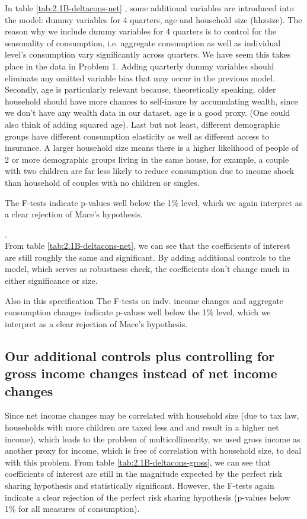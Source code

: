 \documentclass[12pt,a4paper]{article}
\begin{document}
In table \ref{tab:2.1B-deltacons-net} , some additional variables are introduced into the model: dummy variables for 4 quarters, age and household size (hhzsize). The reason why we include dummy variables for 4 quarters is to control for the seasonality of consumption, i.e. aggregate consumption as well as individual level's consumption vary significantly across quarters. We have seem this takes place in the data in Problem 1. Adding quarterly dummy variables should eliminate any omitted variable bias that may occur in the previous model. Secondly, age is particularly relevant because, theoretically speaking, older household should have more chances to self-insure by accumulating wealth, since we don't have any wealth data in our dataset, age is a good proxy. (One could also think of adding squared age). Last but not least, different demographic groups have different consumption elasticity as well as different access to insurance. A larger household size means there is a higher likelihood of people of 2 or more demographic groups living in the same house, for example, a couple with two children are far less likely to reduce consumption due to income shock than household of couples with no children or singles.

The F-tests indicate p-values well below the 1\% level, which we again interpret as a clear rejection of Mace's hypothesis. 

. \\

From table \ref{tab:2.1B-deltacons-net}, we can see that the coefficients of interest are still roughly the same and significant. By adding additional controls to the model, which serves as robustness check, the coefficients don't change much in either significance or size. 

Also in this specification The F-tests on indv. income changes and aggregate consumption changes indicate p-values well below the 1\% level, which we interpret as a clear rejection of Mace's hypothesis. 

\subsection*{Our additional controls plus controlling for gross income changes instead of net income changes}
Since net income changes may be correlated with household size (due to tax law, households with more children are taxed less and and result in a higher net income), which leads to the problem of multicollinearity, we used gross income as another proxy for income, which is free of correlation with household size, to deal with this problem. From table \ref{tab:2.1B-deltacons-gross}, we can see that coefficients of interest are still in the magnitude expected by the perfect risk sharing hypothesis and statistically significant. However, the F-tests again indicate a clear rejection of the perfect risk sharing hypothesis (p-values below 1\% for all measures of consumption).
\end{document}

